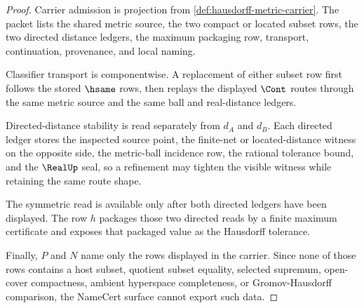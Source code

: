 \begin{proof}
Carrier admission is projection from \autoref{def:hausdorff-metric-carrier}. The packet lists the shared metric source, the two compact or located subset rows, the two directed distance ledgers, the maximum packaging row, transport, continuation, provenance, and local naming.

Classifier transport is componentwise. A replacement of either subset row first follows the stored $\hsame$ rows, then replays the displayed $\Cont$ routes through the same metric source and the same ball and real-distance ledgers.

Directed-distance stability is read separately from $d_A$ and $d_B$. Each directed ledger stores the inspected source point, the finite-net or located-distance witness on the opposite side, the metric-ball incidence row, the rational tolerance bound, and the $\RealUp$ seal, so a refinement may tighten the visible witness while retaining the same route shape.

The symmetric read is available only after both directed ledgers have been displayed. The row $h$ packages those two directed reads by a finite maximum certificate and exposes that packaged value as the Hausdorff tolerance.

Finally, $P$ and $N$ name only the rows displayed in the carrier. Since none of those rows contains a host subset, quotient subset equality, selected supremum, open-cover compactness, ambient hyperspace completeness, or Gromov-Hausdorff comparison, the NameCert surface cannot export such data.
\end{proof}

